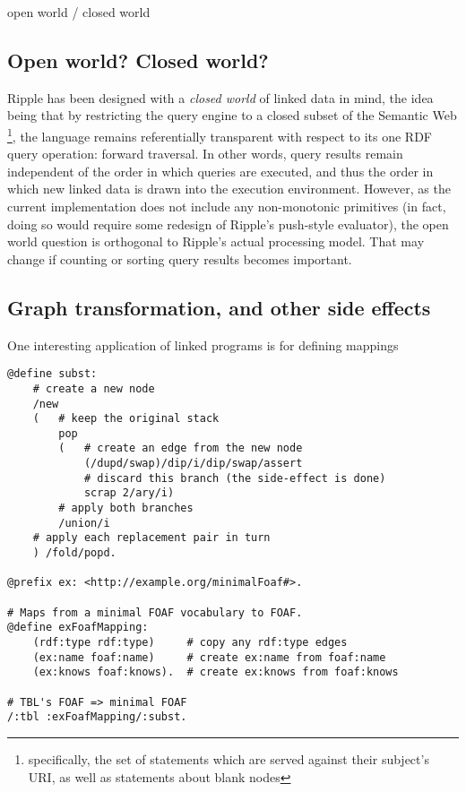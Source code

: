 \documentclass[runningheads]{llncs}
\begin{document}
open world / closed world


\subsection{Open world?  Closed world?}

Ripple has been designed with a \textit{closed world} of linked data in mind, the idea being that by restricting the query engine to a closed subset of the Semantic Web \footnote{specifically, the set of statements which are served against their subject's URI, as well as statements about blank nodes}, the language remains referentially transparent with respect to its one RDF query operation: forward traversal.  In other words, query results remain independent of the order in which queries are executed, and thus the order in which new linked data is drawn into the execution environment.  However, as the current implementation does not include any non-monotonic primitives (in fact, doing so would require some redesign of Ripple's push-style evaluator), the open world question is orthogonal to Ripple's actual processing model.  That may change if counting or sorting query results becomes important.

\subsection{Graph transformation, and other side effects}

One interesting application of linked programs is for defining mappings 

\begin{verbatim}
@define subst:
    # create a new node
    /new
    (   # keep the original stack
        pop
        (   # create an edge from the new node
            (/dupd/swap)/dip/i/dip/swap/assert
            # discard this branch (the side-effect is done)
            scrap 2/ary/i)
        # apply both branches
        /union/i
    # apply each replacement pair in turn
    ) /fold/popd.

@prefix ex: <http://example.org/minimalFoaf#>.

# Maps from a minimal FOAF vocabulary to FOAF.
@define exFoafMapping:
    (rdf:type rdf:type)     # copy any rdf:type edges
    (ex:name foaf:name)     # create ex:name from foaf:name
    (ex:knows foaf:knows).  # create ex:knows from foaf:knows

# TBL's FOAF => minimal FOAF
/:tbl :exFoafMapping/:subst.
\end{verbatim}
\end{document}
